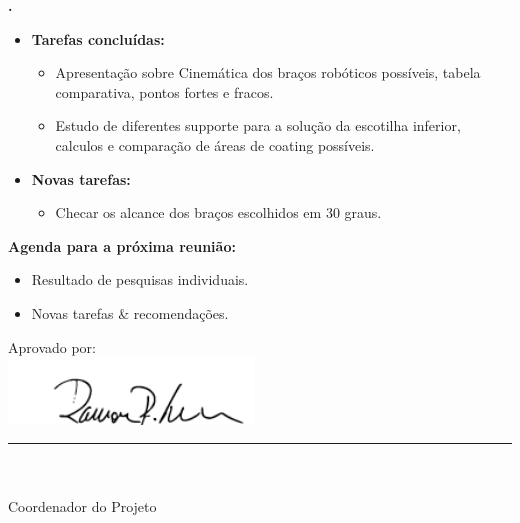 			
   \textbf{\Renan.} 
	\begin{itemize}
		\item \textbf{Tarefas concluídas:}
			\begin{itemize}    
				\item Apresentação sobre Cinemática dos braços robóticos possíveis, 
				tabela comparativa, pontos fortes e fracos.
				\item Estudo de diferentes supporte para a solução da escotilha inferior,
				calculos e comparação de áreas de coating possíveis.
			\end{itemize}
		
		\item \textbf{Novas tarefas:}
			\begin{itemize} 
			    \item Checar os alcance dos braços escolhidos em 30 graus.
			\end{itemize}
	\end{itemize}		



\textbf{Agenda para a próxima reunião:}
  \begin{itemize}
    \item Resultado de pesquisas individuais.
    \item Novas tarefas \& recomendações.
  \end{itemize}


\vspace{5mm}%
\parbox[t]{70mm}{
  Aprovado por: \\[5mm]
  \centering
  \includegraphics[width=65mm]{figs/logo/assinatura-ramon.png} \\[-4mm]
  \rule[2mm]{70mm}{0.1mm} \\
  \ramon \\[1mm]
  Coordenador do Projeto \\
}

\fim
